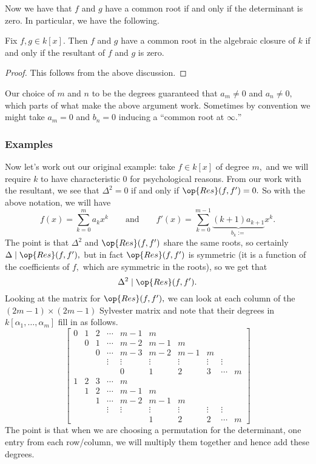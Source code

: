 Now we have that $f$ and $g$ have a common root if and only if the determinant is zero. In particular, we have the following.
\begin{proposition}
	Fix $f,g\in k[x].$ Then $f$ and $g$ have a common root in the algebraic closure of $k$ if and only if the resultant of $f$ and $g$ is zero.
\end{proposition}
\begin{proof}
	This follows from the above discussion.
\end{proof}
\begin{remark}
	Our choice of $m$ and $n$ to be the degrees guaranteed that $a_m\ne0$ and $a_n\ne0,$ which parts of what make the above argument work. Sometimes by convention we might take $a_m=0$ and $b_n=0$ inducing a ``common root at $\infty.$''
\end{remark}

\subsubsection{Examples}
Now let's work out our original example: take $f\in k[x]$ of degree $m,$ and we will require $k$ to have characteristic $0$ for psychological reasons. From our work with the resultant, we see that $\Delta^2=0$ if and only if $\op{Res}(f,f')=0.$ So with the above notation, we will have
\[f(x)=\sum_{k=0}^ma_kx^k\qquad\text{and}\qquad f'(x)=\sum_{k=0}^{m-1}\underbrace{(k+1)a_{k+1}}_{b_k:=}x^k.\]
The point is that $\Delta^2$ and $\op{Res}(f,f')$ share the same roots, so certainly $\Delta\mid\op{Res}(f,f'),$ but in fact $\op{Res}(f,f')$ is symmetric (it is a function of the coefficients of $f,$ which are symmetric in the roots), so we get that
\[\Delta^2\mid\op{Res}(f,f').\]
Looking at the matrix for $\op{Res}(f,f'),$ we can look at each column of the $(2m-1)\times(2m-1)$ Sylvester matrix and note that their degrees in $k[\alpha_1,\ldots,\alpha_m]$ fill in as follows.
\[\begin{bmatrix}
	0 & 1 & 2 & \cdots & m-1    & m      &        &        &        &   \\
	  & 0 & 1 & \cdots & m-2    & m-1    & m      &        &        &   \\
	  &   & 0 & \cdots & m-3    & m-2    & m-1    & m      &        &   \\
	  &   &   & \vdots & \vdots & \vdots & \vdots & \vdots & \vdots &   \\
	  &   &   &        & 0      & 1      & 2      & 3      & \cdots & m \\
	1 & 2 & 3 & \cdots & m      &        &        &        &        &   \\
	  & 1 & 2 & \cdots & m-1    & m      &        &        &        &   \\
	  &   & 1 & \cdots & m-2    & m-1    & m      &        &        &   \\
	  &   &   & \vdots & \vdots & \vdots & \vdots & \vdots & \vdots &   \\
	  &   &   &        &        & 1      & 2      & 2      & \cdots & m
\end{bmatrix}\]
The point is that when we are choosing a permutation for the determinant, one entry from each row/column, we will multiply them together and hence add these degrees.

